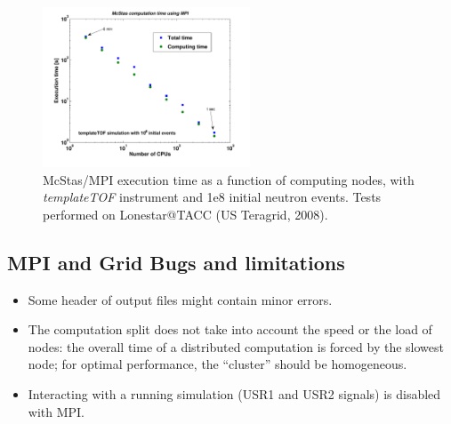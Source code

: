 \begin{figure}[htb!]
  \begin{center}
    \includegraphics[width=0.55\textwidth]{figures/mpi_efficiency}
  \end{center}
  \caption{McStas/MPI execution time as a function of computing nodes, with {\it
      templateTOF} instrument and 1e8 initial neutron events. Tests performed on
    Lonestar@TACC (US Teragrid, 2008).}
\label{fig:mpi_efficiency}
\end{figure}

\subsection{MPI and Grid Bugs and limitations}

\begin{itemize}
\item Some header of output files might contain minor errors.
\item The computation split does not take into account the speed or the
  load of nodes: the overall time of a distributed computation is
  forced by the slowest node; for optimal performance, the ``cluster''
  should be homogeneous.
\item Interacting with a running simulation (USR1 and USR2 signals) is disabled
  with MPI.
\end{itemize}

